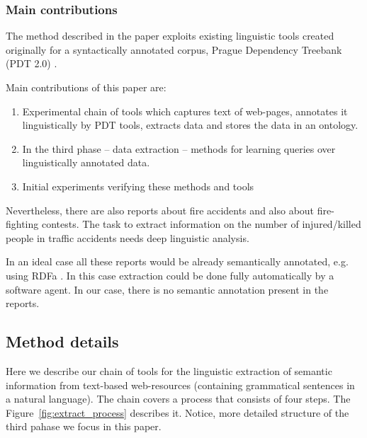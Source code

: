 \subsubsection{Main contributions}

The method described in the paper exploits existing linguistic tools created originally for a syntactically annotated corpus, Prague Dependency Treebank (PDT 2.0) \citep{biblio:PDT20_CD}.

Main contributions of this paper are: 
 
\begin{enumerate}
\item  Experimental chain of tools which captures text of web-pages, annotates it linguistically by PDT tools, extracts data and stores the data in an ontology. %
\item  In the third phase -- data extraction -- methods for learning queries over linguistically annotated data. 
\item Initial experiments verifying these methods and tools
\end{enumerate}
 
Nevertheless, there are also reports about fire accidents and also about fire-fighting contests. The task to extract information on the number of injured/killed people in traffic accidents needs deep linguistic analysis.

In an ideal case all these reports would be already semantically annotated, e.g. using RDFa \citep{biblio:RDFa}. In this case extraction could be done fully automatically by a software agent. In our case, there is no semantic annotation present in the reports.





\subsection{Method details}

Here we describe our chain of tools for the linguistic extraction of semantic information from text-based web-resources (containing grammatical sentences in a natural language). The chain covers a process that consists of four steps. The Figure~\ref{fig:extract_process} describes it. Notice, more detailed structure of the third pahase we focus in this paper.

